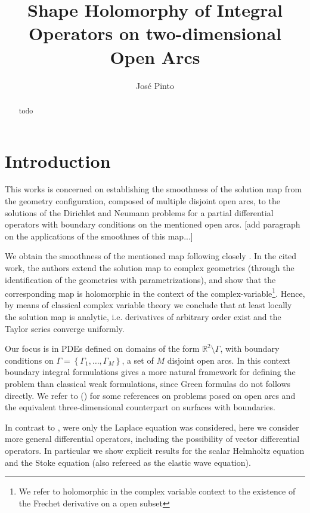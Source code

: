 \documentclass{article}
\title{Shape Holomorphy of Integral Operators on two-dimensional Open Arcs}
\author{Jos\'e Pinto}
\newcommand{\todo}[1]{{\color{red}[#1]}}
\newcommand{\IR}{{\mathbb R}}
\begin{document}
\maketitle

\begin{abstract}
todo
\end{abstract}

\section{Introduction}
This works is concerned on establishing the smoothness of the solution map from the geometry configuration, composed of multiple disjoint open arcs, to the solutions of the Dirichlet and Neumann problems for a partial differential operators with boundary conditions on the mentioned open arcs. 
\todo{add paragraph on the applications of the smoothnes of this map...}

We obtain the smoothness of the mentioned map following closely \cite{Henriquez2021}. In the cited work, the authors extend the solution map to complex geometries (through the identification of the geometries with parametrizations), and show that the corresponding map is holomorphic in the context of the complex-variable\footnote{We refer to holomorphic in the complex variable context to the existence of the Frechet derivative on a open subset}. Hence, by means of classical complex variable theory we conclude that at least locally the solution map is analytic, i.e. derivatives of arbitrary order exist and the Taylor series converge uniformly. 

Our focus is in PDEs defined on domains of the form $\IR^2 \setminus \Gamma$, with boundary conditions on $\Gamma = \left\lbrace \Gamma_1, \hdots, \Gamma_M \right\rbrace$, a set of $M$ disjoint open arcs. In this context boundary integral formulations gives a more  natural framework for defining the problem than classical weak formulations, since Green formulas do not follows directly. We refer to (\cite{stephane,stephan1984augmented,STE86,Stephan1987,sloan1991,JEREZHANCKES2011547,JHP20,Averseng2019,kress1996,kress2000}) for some references on problems posed on open arcs and the equivalent three-dimensional counterpart on surfaces with boundaries.  

In contrast to \cite{Henriquez2021}, were only the Laplace equation was considered, here we consider more general differential operators, including the possibility of vector differential operators. In particular we show explicit results for the scalar Helmholtz equation and the Stoke equation (also refereed as the elastic wave equation). 
\end{document}

